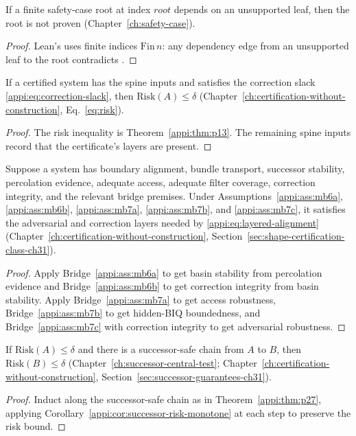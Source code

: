 \begin{lemma}
\label{appi:lem:p40}
If a finite safety-case root at index \(root\) depends on an unsupported leaf, then the root is not proven (Chapter~\ref{ch:safety-case}).
\end{lemma}
\begin{proof}
Lean's  uses finite indices \(\mathrm{Fin}\,n\): any dependency edge from an unsupported leaf to the root contradicts .
\end{proof}

\begin{theorem}
\label{appi:thm:p30}
If a certified system has the spine inputs and satisfies the correction slack \eqref{appi:eq:correction-slack}, then \(\mathrm{Risk}(A)\leq\delta\) (Chapter~\ref{ch:certification-without-construction}, Eq.~\eqref{eq:risk}).
\end{theorem}
\begin{proof}
The risk inequality is Theorem~\ref{appi:thm:p13}. The remaining spine inputs record that the certificate's layers are present.
\end{proof}

\begin{corollary}
\label{appi:cor:bridge-layered-certification}
Suppose a system has boundary alignment, bundle transport, successor stability, percolation evidence, adequate access, adequate filter coverage, correction integrity, and the relevant bridge premises. Under Assumptions~\ref{appi:ass:mb6a}, \ref{appi:ass:mb6b}, \ref{appi:ass:mb7a}, \ref{appi:ass:mb7b}, and \ref{appi:ass:mb7c}, it satisfies the adversarial and correction layers needed by \eqref{appi:eq:layered-alignment} (Chapter~\ref{ch:certification-without-construction}, Section~\ref{sec:shape-certification-class-ch31}).
\end{corollary}
\begin{proof}
Apply Bridge~\ref{appi:ass:mb6a} to get basin stability from percolation evidence and Bridge~\ref{appi:ass:mb6b} to get correction integrity from basin stability. Apply Bridge~\ref{appi:ass:mb7a} to get access robustness, Bridge~\ref{appi:ass:mb7b} to get hidden-BIQ boundedness, and Bridge~\ref{appi:ass:mb7c} with correction integrity to get adversarial robustness.
\end{proof}

\begin{corollary}
\label{appi:cor:successor-chain-risk}
If \(\mathrm{Risk}(A)\leq\delta\) and there is a successor-safe chain from \(A\) to \(B\), then \(\mathrm{Risk}(B)\leq\delta\) (Chapter~\ref{ch:successor-central-test}; Chapter~\ref{ch:certification-without-construction}, Section~\ref{sec:successor-guarantees-ch31}).
\end{corollary}
\begin{proof}
Induct along the successor-safe chain as in Theorem~\ref{appi:thm:p27}, applying Corollary~\ref{appi:cor:successor-risk-monotone} at each step to preserve the risk bound.
\end{proof}

